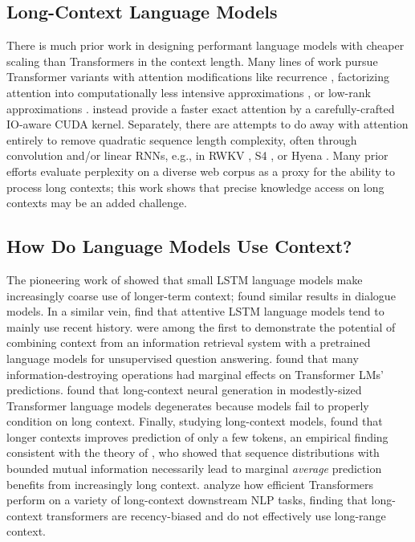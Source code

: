 \subsection{Long-Context Language Models} There is much prior work in designing performant language models with cheaper scaling than Transformers in the context length. Many lines of work pursue Transformer variants with attention modifications like recurrence \cite{dai-etal-2019-transformer}, factorizing attention into computationally less intensive approximations \cite{beltagy2020longformer,zaheer2020big}, or low-rank approximations \cite{Wang2020LinformerSW,peng2021random}.
\citet{dao2022flashattention} instead provide a faster exact attention by a carefully-crafted IO-aware CUDA kernel. Separately, there are attempts to do away with attention entirely to remove quadratic sequence length complexity, often through convolution and/or linear RNNs, e.g., in RWKV \cite{PENG_RWKV-LM_2021}, S4 \cite{gu2022efficiently}, or Hyena \cite{poli2023hyena}. Many prior efforts evaluate perplexity on a diverse web corpus as a proxy for the ability to process long contexts; this work shows that precise knowledge access on long contexts may be an added challenge.

\subsection{How Do Language Models Use Context?} The pioneering work of \citet{khandelwal-etal-2018-sharp} showed that small LSTM language models make increasingly coarse use of longer-term context; \citet{sankar2019neural} found similar results in dialogue models. In a similar vein, \citet{daniluk2017frustratingly} find that attentive LSTM language models tend to mainly use recent history.
\citet{petroni2020context} were among the first to demonstrate the potential of combining context from an information retrieval system with a pretrained language models for unsupervised question answering.
\citet{oconnor-andreas-2021-context} found that many information-destroying operations had marginal effects on Transformer LMs' predictions.
\citet{krishna2022rankgen} found that long-context neural generation in modestly-sized Transformer language models degenerates because models fail to properly condition on long context. Finally, studying long-context models, \citet{sun-etal-2021-long} found that longer contexts improves prediction of only a few tokens, an empirical finding consistent with the theory of \citet{sharan2018prediction}, who showed that sequence distributions with bounded mutual information necessarily lead to marginal \textit{average} prediction benefits from increasingly long context.
\citet{qin-etal-2023-nlp} analyze how efficient Transformers perform on a variety of long-context downstream NLP tasks, finding that long-context transformers are recency-biased and do not effectively use long-range context.

